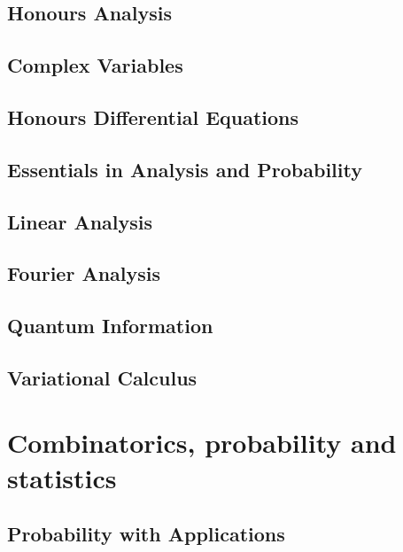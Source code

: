 \documentclass[12pt]{report}
\theoremstyle{definition}
\begin{document}
\chapter{Honours Analysis}\label{cha:honours-analysis}

\chapter{Complex Variables}\label{cha:complex-variables}

\chapter{Honours Differential Equations}\label{cha:hono-diff-equat}

\chapter{Essentials in Analysis and Probability\label{cha:essent-analys-prob}}

\chapter{Linear Analysis}\label{cha:linear-analysis}

\chapter{Fourier Analysis}\label{cha:fourier-analysis}

\chapter{Quantum Information}\label{cha:quantum-information}

\chapter{Variational Calculus}\label{cha:variational-calculus}


\part{Combinatorics, probability and statistics}

\chapter{Probability with Applications}\label{cha:prob-with-appl}
\end{document}
